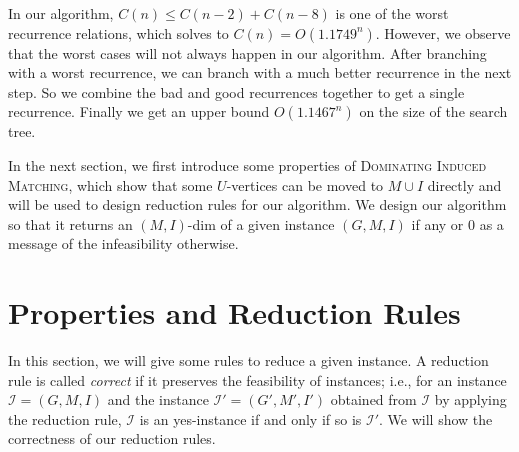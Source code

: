 \documentclass{elsart_TR2}
\begin{document}


\medskip




In our algorithm, $C(n)\leq C(n-2)+C(n-8)$ is one of the worst recurrence relations, which solves to $C(n)=O(1.1749^n)$.
However, we observe that the worst cases will not always happen in our algorithm. After branching with a worst recurrence,
we can branch with a much better recurrence in the next step. So we combine the bad and good recurrences together to get a single recurrence.
Finally we get an upper bound $O(1.1467^n)$ on the size of the search tree.



In the next section, we first introduce some properties of \textsc{Dominating Induced Matching},
which show that some $U$-vertices can be moved to $M\cup I$ directly and will be used to design reduction rules for our algorithm.
We design our algorithm so that it returns an  $(M,I)$-dim of a given instance $(G,M,I)$ if any or
0 as a message of the infeasibility otherwise.




\section{Properties and Reduction Rules}
\label{sec_rules}

In this section, we will give some rules to reduce a given instance.
A reduction rule is called \emph{correct} if it preserves the feasibility of instances; i.e.,
for an instance $\mathcal{I}=(G,M,I)$ and the instance  $\mathcal{I}'=(G',M',I')$ obtained from $\mathcal{I}$ by applying the reduction rule,
   $\mathcal{I}$ is an yes-instance if and only if so is $\mathcal{I}'$. We will show the correctness of our reduction rules.
\end{document}
